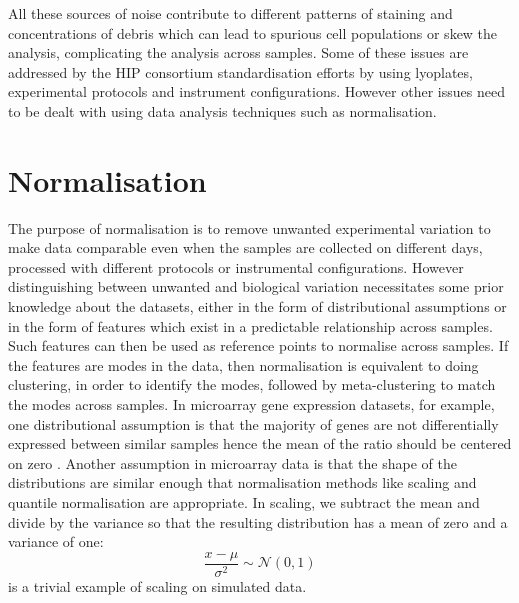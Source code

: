 All these sources of noise contribute to different patterns of staining and concentrations of debris
which can lead to spurious cell populations or skew the analysis, complicating the analysis across samples.
Some of these issues are addressed by the \gls{HIP} consortium standardisation efforts \citep{Maecker:2012gl}
by using lyoplates, experimental protocols and instrument configurations.
However other issues need to be dealt with using data analysis techniques such as normalisation.

\section{Normalisation}

The purpose of normalisation is to remove unwanted experimental variation to make data comparable even when the samples are
collected on different days, processed with different protocols or instrumental configurations.
However distinguishing between unwanted and biological variation necessitates some prior knowledge about the datasets, either in the form of distributional assumptions
or in the form of features which exist in a predictable relationship across samples.
Such features can then be used as reference points to normalise across samples.
If the features are modes in the data, then normalisation is equivalent to doing clustering, in order to identify the modes,
followed by meta-clustering to match the modes across samples.
In microarray gene expression datasets, for example, one distributional assumption is that the majority of genes are not differentially expressed between similar samples
hence the mean of the ratio should be centered on zero \citep{Smyth:2003ie,Bolstad:2003ia}.
Another assumption in microarray data is that the shape of the distributions are similar enough that normalisation  methods like scaling and quantile normalisation
are appropriate.  In scaling, we subtract the mean and divide by the variance so that the resulting distribution has a mean of zero and a variance of one:
\[
  \frac{x-\mu}{\sigma^2} \sim \mathcal{N}(0,1)
\]
 is a trivial example of scaling on simulated data.

